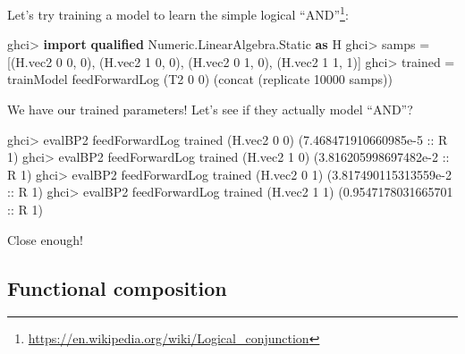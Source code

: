 \documentclass[]{article}
\newenvironment{Shaded}{}{}
\newcommand{\DataTypeTok}[1]{\textcolor[rgb]{0.56,0.13,0.00}{#1}}
\newcommand{\DecValTok}[1]{\textcolor[rgb]{0.25,0.63,0.44}{#1}}
\newcommand{\FloatTok}[1]{\textcolor[rgb]{0.25,0.63,0.44}{#1}}
\newcommand{\FunctionTok}[1]{\textcolor[rgb]{0.02,0.16,0.49}{#1}}
\newcommand{\KeywordTok}[1]{\textcolor[rgb]{0.00,0.44,0.13}{\textbf{#1}}}
\newcommand{\NormalTok}[1]{#1}
\newcommand{\OtherTok}[1]{\textcolor[rgb]{0.00,0.44,0.13}{#1}}
\renewcommand{\href}[2]{#2\footnote{\url{#1}}}
\begin{document}
Let's try training a model to learn the simple
\href{https://en.wikipedia.org/wiki/Logical_conjunction}{logical ``AND''}:

\begin{Shaded}
\begin{Highlighting}[]
\NormalTok{ghci}\FunctionTok{>} \KeywordTok{import} \KeywordTok{qualified} \DataTypeTok{Numeric.LinearAlgebra.Static} \KeywordTok{as} \DataTypeTok{H}
\NormalTok{ghci}\FunctionTok{>}\NormalTok{ samps }\FunctionTok{=}\NormalTok{ [(H.vec2 }\DecValTok{0} \DecValTok{0}\NormalTok{, }\DecValTok{0}\NormalTok{), (H.vec2 }\DecValTok{1} \DecValTok{0}\NormalTok{, }\DecValTok{0}\NormalTok{), (H.vec2 }\DecValTok{0} \DecValTok{1}\NormalTok{, }\DecValTok{0}\NormalTok{), (H.vec2 }\DecValTok{1} \DecValTok{1}\NormalTok{, }\DecValTok{1}\NormalTok{)]}
\NormalTok{ghci}\FunctionTok{>}\NormalTok{ trained }\FunctionTok{=}\NormalTok{ trainModel feedForwardLog (}\DataTypeTok{T2} \DecValTok{0} \DecValTok{0}\NormalTok{) (concat (replicate }\DecValTok{10000}\NormalTok{ samps))}
\end{Highlighting}
\end{Shaded}

We have our trained parameters! Let's see if they actually model ``AND''?

\begin{Shaded}
\begin{Highlighting}[]
\NormalTok{ghci}\FunctionTok{>}\NormalTok{ evalBP2 feedForwardLog trained (H.vec2 }\DecValTok{0} \DecValTok{0}\NormalTok{)}
\NormalTok{(}\FloatTok{7.468471910660985e-5}\OtherTok{ ::} \DataTypeTok{R} \DecValTok{1}\NormalTok{)}
\NormalTok{ghci}\FunctionTok{>}\NormalTok{ evalBP2 feedForwardLog trained (H.vec2 }\DecValTok{1} \DecValTok{0}\NormalTok{)}
\NormalTok{(}\FloatTok{3.816205998697482e-2}\OtherTok{ ::} \DataTypeTok{R} \DecValTok{1}\NormalTok{)}
\NormalTok{ghci}\FunctionTok{>}\NormalTok{ evalBP2 feedForwardLog trained (H.vec2 }\DecValTok{0} \DecValTok{1}\NormalTok{)}
\NormalTok{(}\FloatTok{3.817490115313559e-2}\OtherTok{ ::} \DataTypeTok{R} \DecValTok{1}\NormalTok{)}
\NormalTok{ghci}\FunctionTok{>}\NormalTok{ evalBP2 feedForwardLog trained (H.vec2 }\DecValTok{1} \DecValTok{1}\NormalTok{)}
\NormalTok{(}\FloatTok{0.9547178031665701}\OtherTok{ ::} \DataTypeTok{R} \DecValTok{1}\NormalTok{)}
\end{Highlighting}
\end{Shaded}

Close enough!

\hypertarget{functional-composition}{%
\subsection{Functional composition}\label{functional-composition}}
\end{document}
